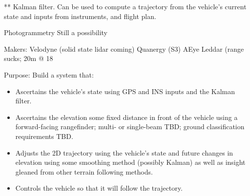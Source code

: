 \documentclass[10pt,a4paper]{report}
\begin{document}
** Kalman filter. Can be used to compute a trajectory from the vehicle’s current state and inputs from instruments, and flight plan. 



Photogrammetry
Still a possibility

Makers:
Velodyne (solid state lidar coming)
Quanergy (S3)
AEye
Leddar (range sucks; 20m @ 18%

Purpose: Build a system that:

\begin{itemize}
\item Ascertains the vehicle's state using GPS and INS inputs and the Kalman filter.
\item Ascertains the elevation some fixed distance in front of the vehicle using a forward-facing rangefinder; multi- or single-beam TBD; ground classification requirements TBD.
\item Adjusts the 2D trajectory using the vehicle's state and future changes in elevation using some smoothing method (possibly Kalman) as well as insight gleaned from other terrain following methods.
\item Controls the vehicle so that it will follow the trajectory.
\end{itemize}




\end{document}
